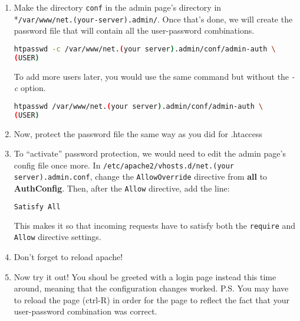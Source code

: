 \documentclass[11pt]{article}
\begin{document}
\begin {itemize}
\begin{enumerate}
    \item Make the directory \verb|conf| in the admin page's directory in \\*\verb|/var/www/net.(your-server).admin/|. Once that's done, we will create the password file that will contain all the user-password combinations.
    \begin{lstlisting}[basicstyle=\ttfamily, backgroundcolor = \color{lightgray}, language = bash, xleftmargin = 0cm, framexleftmargin = 1em, framexrightmargin = 10em, showstringspaces=false] 
htpasswd -c /var/www/net.(your server).admin/conf/admin-auth \
(USER)
\end{lstlisting}
    To add more users later, you would use the same command but without the \emph{-c} option. 
    \begin{lstlisting}[basicstyle=\ttfamily, backgroundcolor = \color{lightgray}, language = bash, xleftmargin = 0cm, framexleftmargin = 1em, framexrightmargin = 8em, showstringspaces=false] 
htpasswd /var/www/net.(your server).admin/conf/admin-auth \
(USER)
\end{lstlisting}
  
    \item Now, protect the password file the same way as you did for .htaccess
  
    \item To ``activate'' password protection, we would need to edit the admin page's config file once more. In \verb|/etc/apache2/vhosts.d/net.(your server).admin.conf|, change the \verb|AllowOverride| directive from \textbf{all} to \textbf{AuthConfig}. Then, after the \verb|Allow| directive, add the line:
    \begin{lstlisting}[basicstyle=\ttfamily, backgroundcolor = \color{lightgray}, language = bash, xleftmargin = 0cm, framexleftmargin = 1em, framexrightmargin = 6em, showstringspaces=false] 
Satisfy All
\end{lstlisting}
    This makes it so that incoming requests have to satisfy both the \verb|require| and \verb|Allow| directive settings.
    
    \item Don't forget to reload apache!
    
    \item Now try it out! You shoul be greeted with a login page instead this time around, meaning that the configuration changes worked. P.S. You may have to reload the page (ctrl-R) in order for the page to reflect the fact that your user-password combination was correct.
  

\end{enumerate}
\end{itemize}
\end{document}
